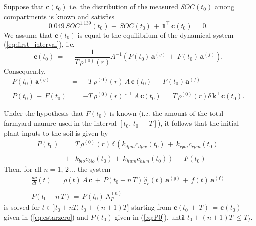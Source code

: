 \noindent Suppose that  $\mathbf{c}(t_0)$ i.e. the distribution of the measured  $SOC(t_0)$ among compartments is known and satisfies
$$
 0.049\, SOC^{1.139}(t_0)\,-\, SOC(t_0)\, +\, \mathds{1}^\intercal \,\mathbf{c}(t_0) =\, 0.$$
We assume that $\mathbf{c}(t_0)$ is equal to the equilibrium of the dynamical system (\ref{eq:first_interval}), i.e.  
\begin{equation}\label{eq:cstarzero}
  \mathbf{c}(t_0)\, =\, \displaystyle -\frac{1}{T\,\rho^{(0)}(r)}A^{-1} \left( P(t_0)\, \mathbf{a}^{(g)}\,+\, F(t_0)\, \mathbf{a}^{(f)}\right). 
\end{equation}
Consequently,
\begin{equation}\label{eq:P0+F0}
\begin{array}{rcl}
   P(t_0)\, \mathbf{a}^{(g)}   & =& -T\,\rho^{(0)}(r)\,  A \, \mathbf{c}(t_0)\,-\, F(t_0)\, \mathbf{a}^{(f)}  \\\\
    P(t_0) \,+\, F(t_0) & =& -T\, \rho^{(0)}(r)\,\mathds{1}^\intercal \, A \, \mathbf{c}(t_0)\,=\, T\, \rho^{(0)}(r) \delta\, \mathbf{k}^\intercal\, \mathbf{c}(t_0). 
\end{array}
  \end{equation}

\noindent Under the hypothesis that $F(t_0)$ is known (i.e. the amount of the total farmyard manure used in the interval $[t_0, \, t_0\,+\, T]$), it follows that the  initial plant inputs to the soil is given by 
\begin{equation}\label{eq:P0}
\begin{array}{rcl}
     P(t_0) &=& T\,\rho^{(0)}(r)\,\delta\, \left(k_{dpm}c_{dpm}(t_0)\,+\,k_{rpm}c_{rpm}(t_0)\,\right.\\\\
     & +&\left. k_{bio}c_{bio}(t_0)\,+ \,k_{hum}c_{hum}(t_0)\right)\, -\, F(t_0)
\end{array}
\end{equation}
 Then, for all $n=1,\,2\, \dots$ the system
\begin{equation}\label{eq:model}
   \begin{array}{l}
   \displaystyle \frac{d \mathbf{c}}{dt}(t)\,=\, 
\rho(t)\,  A \, \mathbf{c}\,+\,   P(t_0+n\,T)\,\hat g_r(t) \, \mathbf{a}^{(g)}\, +\,   f(t) \, \mathbf{a}^{(f)}\\\\
P(t_0+n\,T) \,=\, P(t_0)\, N_P^{(n)}
\end{array} 
\end{equation}
 is solved for $t\in]t_0+nT,\,t_0+(n+1)T]$ starting from $\mathbf{ c}(t_0\,+\,T)\, =\,\mathbf{c}(t_0) $ given in (\ref{eq:cstarzero})  and $P(t_0)$ given in (\ref{eq:P0}),  until $t_0+(n+1)T\,\leq  T_f$. 
 

